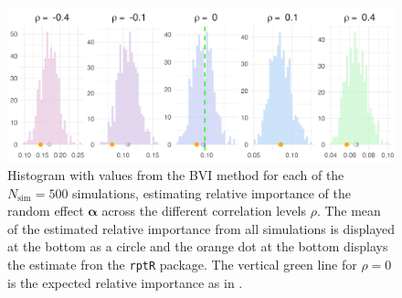 \begin{figure}[H]
  \centering
    \includegraphics[width=1\linewidth]{Figures/Simulation study/Random_logit.png}
    \caption[Relative importance of the random effect $\boldsymbol{\alpha}$ in Binomial GLMM]{Histogram with values from the BVI method for each of the $N_{\text{sim}}=500$ simulations, estimating relative importance of the random effect $\boldsymbol{\alpha}$ across the different correlation levels $\rho$. The mean of the estimated relative importance from all simulations is displayed at the bottom as a circle and the orange dot at the bottom displays the estimate fron the \texttt{rptR} package. The vertical green line for $\rho=0$ is the expected relative importance as in .}
    \label{fig:relimp_random_logit}
\end{figure}
